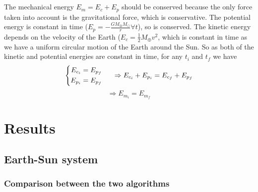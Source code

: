 \documentclass[a4paper, twoside, 11pt]{report}
\theoremstyle{theorem}
\theoremstyle{remark}
\theoremstyle{exemple}
\begin{document}
            \paragraph{}The mechanical energy $E_m = E_c + E_p$ should be conserved because the only force taken into account is the gravitational force, which is conservative. The potential energy is constant in time ($E_p = -\frac{GM_{\oplus}M_{\odot}}{r} \forall t$), so is conserved. The kinetic energy depends on the velocity of the Earth ($E_c = \frac{1}{2}M_{\oplus}v^2$, which is constant in time as we have a uniform circular motion of the Earth around the Sun. So as both of the kinetic and potential energies are constant in time, for any $t_i$ and $t_f$ we have
                \begin{equation*}
                    \left\{
                        \begin{aligned}
                            E_{c_i} &= E_{p_f}\\
                            E_{p_i} &= E_{p_f}
                        \end{aligned}
                    \right. \hspace{0.5cm} \Rightarrow E_{c_i} + E_{p_i} = E_{c_f} + E_{p_f}
                \end{equation*} 
                \begin{equation*}
                    \Rightarrow E_{m_i} = E_{m_f}
                \end{equation*}
                
          
    
    

\chapter{Results}
    \section{Earth-Sun system}
        \subsection{Comparison between the two algorithms}
\end{document}
